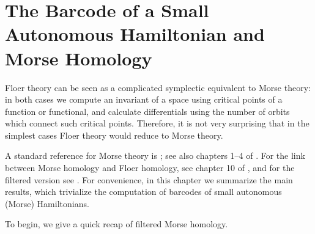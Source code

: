 \chapter{The Barcode of a Small Autonomous Hamiltonian and Morse Homology}
\label{subsecautonomous}

Floer theory can be seen as a complicated symplectic equivalent to Morse theory: in both cases we compute an invariant of a space using critical points of a function or functional, and calculate differentials using the number of orbits which connect such critical points. Therefore, it is not very surprising that in the simplest cases Floer theory would reduce to Morse theory.

A standard reference for Morse theory is \cite{milnor}; see also chapters 1--4 of \cite{audin}. For the link between Morse homology and Floer homology, see chapter 10 of \cite{audin}, and for the filtered version see \cite{polterovich}. For convenience, in this chapter we summarize the main results, which trivialize the computation of barcodes of small autonomous (Morse) Hamiltonians.

To begin, we give a quick recap of filtered Morse homology.

